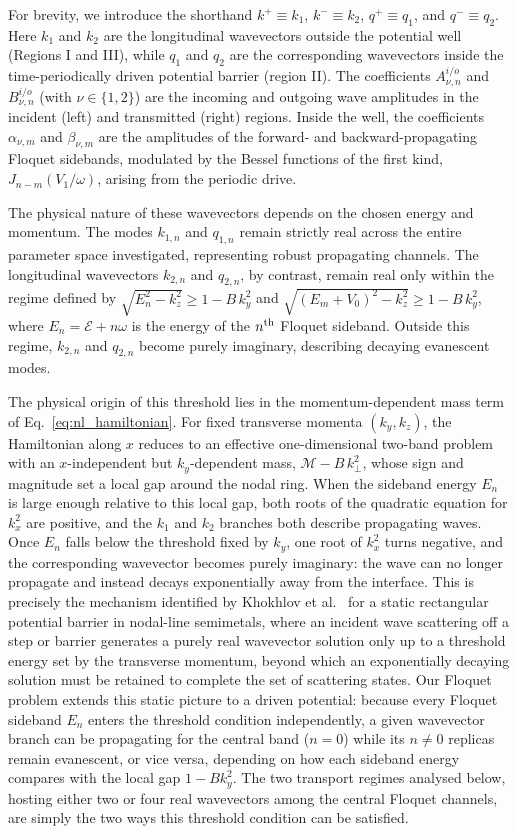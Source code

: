 \documentclass[aps,prb,onecolumn,longbibliography,nofootinbib,citeautoscript,10pt]{revtex4-2}
\begin{document}
For brevity, we introduce the shorthand $k^{+} \equiv k_1$, $k^{-} \equiv k_2$, $q^{+} \equiv q_1$, and $q^{-} \equiv q_2$. Here $k_1$ and $k_2$ are the longitudinal wavevectors outside the potential well (Regions I and III), while $q_1$ and $q_2$ are the corresponding wavevectors inside the time-periodically driven potential barrier (region II). The coefficients $A_{\nu,n}^{i/o}$ and $B_{\nu,n}^{i/o}$ (with $\nu \in \{1,2\}$) are the incoming and outgoing wave amplitudes in the incident (left) and transmitted (right) regions. Inside the well, the coefficients $\alpha_{\nu,m}$ and $\beta_{\nu,m}$ are the amplitudes of the forward- and backward-propagating Floquet sidebands, modulated by the Bessel functions of the first kind, $J_{n-m}(V_1/\omega)$, arising from the periodic drive.

The physical nature of these wavevectors depends on the chosen energy and momentum. The modes $k_{1,n}$ and $q_{1,n}$ remain strictly real across the entire parameter space investigated, representing robust propagating channels. The longitudinal wavevectors $k_{2,n}$ and $q_{2,n}$, by contrast, remain real only within the regime defined by $\sqrt{E_n^2-k_z^2} \geq 1-B \, k_y^2$ and $\sqrt{(E_m+V_0)^2-k_z^2} \geq 1-B \,k_y^2$, where $E_n = \mathcal{E} + n\omega$ is the energy of the $ n^{\rm th}$ Floquet sideband. Outside this regime, $k_{2,n}$ and $q_{2,n}$ become purely imaginary, describing decaying evanescent modes.

The physical origin of this threshold lies in the momentum-dependent mass term of Eq.~\eqref{eq:nl_hamiltonian}. For fixed transverse momenta $(k_y,k_z)$, the Hamiltonian along $x$ reduces to an effective one-dimensional two-band problem with an $x$-independent but $k_y$-dependent mass, $\mathcal{M}-B \, k_\perp^2 $, whose sign and magnitude set a local gap around the nodal ring. When the sideband energy $E_n$ is large enough relative to this local gap, both roots of the quadratic equation for $k_x^2$ are positive, and the $k_1$ and $k_2$ branches both describe propagating waves. Once $E_n$ falls below the threshold fixed by $k_y$, one root of $k_x^2$ turns negative, and the corresponding wavevector becomes purely imaginary: the wave can no longer propagate and instead decays exponentially away from the interface. This is precisely the mechanism identified by Khokhlov et al.~\cite{Khokhlov2018} for a static rectangular potential barrier in nodal-line semimetals, where an incident wave scattering off a step or barrier generates a purely real wavevector solution only up to a threshold energy set by the transverse momentum, beyond which an exponentially decaying solution must be retained to complete the set of scattering states. Our Floquet problem extends this static picture to a driven potential: because every Floquet sideband $E_n$ enters the threshold condition independently, a given wavevector branch can be propagating for the central band ($n=0$) while its $n\ne 0$ replicas remain evanescent, or vice versa, depending on how each sideband energy compares with the local gap $1-Bk_y^2$. The two transport regimes analysed below, hosting either two or four real wavevectors among the central Floquet channels, are simply the two ways this threshold condition can be satisfied.
\end{document}
